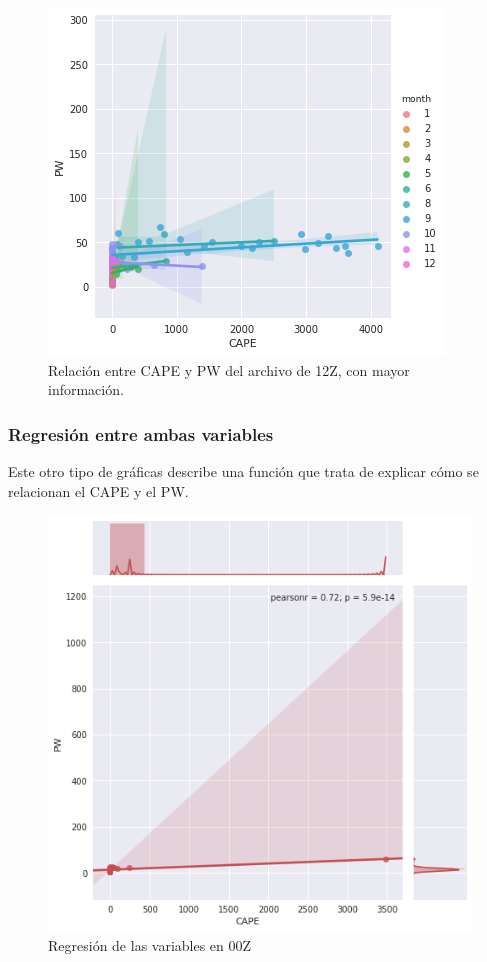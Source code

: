 \documentclass{article}
\begin{document}
\begin{figure}[H]
\includegraphics[width=\linewidth]{CAPEvPW_Otros12Z.png}
\caption{Relación entre CAPE y PW del archivo de 12Z, con mayor información.}
\end{figure}

\subsubsection{Regresión entre ambas variables}
Este otro tipo de gráficas describe una función que trata de explicar cómo se relacionan el CAPE y el PW.

\begin{figure}[H]
\includegraphics[width=\linewidth]{CAPEvPW_Red00Z.png}
\caption{Regresión de las variables en 00Z}
\end{figure}
\end{document}
